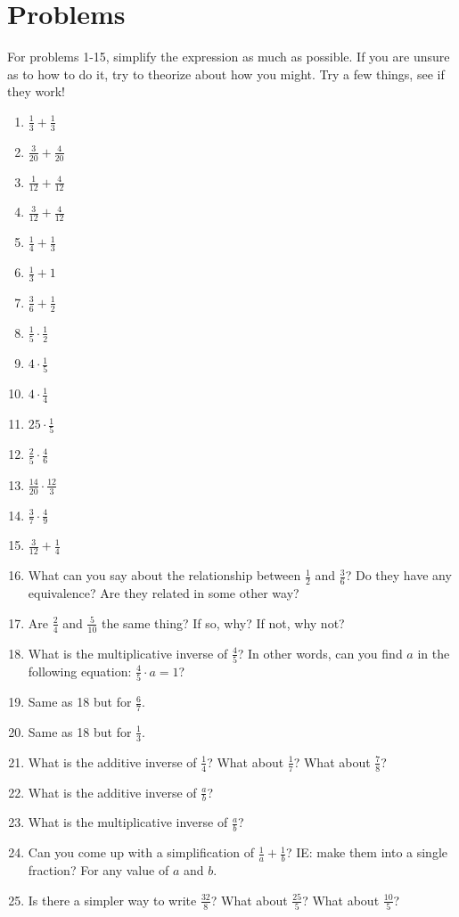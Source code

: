 \documentclass{article}
\begin{document}
\section*{Problems}
\begin{multicols*}{2}
    For problems 1-15, simplify the expression as much as possible. If you are unsure as to how to do it, try to theorize about how you might. Try a few things, see if they work!
    \begin{enumerate}
        \item $ \frac{1}{3} + \frac{1}{3}$
        \item $ \frac{3}{20} + \frac{4}{20} $
        \item $ \frac{1}{12} + \frac{4}{12} $
        \item $ \frac{3}{12} + \frac{4}{12} $
        \item $ \frac{1}{4} + \frac{1}{3} $
        \item $ \frac{1}{3} + 1 $
        \item $ \frac{3}{6} + \frac{1}{2} $
        \item $ \frac{1}{5} \cdot \frac{1}{2} $
        \item $ 4 \cdot \frac{1}{5} $
        \item $ 4 \cdot \frac{1}{4} $ 
        \item $ 25 \cdot \frac{1}{5} $
        \item $ \frac{2}{5} \cdot \frac{4}{6} $
        \item $ \frac{14}{20} \cdot \frac{12}{3} $
        \item $ \frac{3}{7} \cdot \frac{4}{9} $
        \item $ \frac{3}{12} + \frac{1}{4} $
        \item What can you say about the relationship between $\frac{1}{2}$ and $\frac{3}{6}$? Do they have any equivalence? Are they related in some other way?
        \item Are $\frac{2}{4}$ and $\frac{5}{10}$ the same thing? If so, why? If not, why not? 
        \item What is the multiplicative inverse of $\frac{4}{5}$? In other words, can you find $a$ in the following equation: $\frac{4}{5} \cdot a = 1$?
        \item Same as 18 but for $\frac{6}{7}$. 
        \item Same as 18 but for $\frac{1}{3}$. 
        \item What is the additive inverse of $\frac{1}{4}$? What about $\frac{1}{7}$? What about $\frac{7}{8}$? 
        \item What is the additive inverse of $\frac{a}{b}$? 
        \item What is the multiplicative inverse of $\frac{a}{b}$?
        \item Can you come up with a simplification of $\frac{1}{a} + \frac{1}{b}$? IE: make them into a single fraction? For any value of $a$ and $b$. 
        \item Is there a simpler way to write $\frac{32}{8}$? What about $\frac{25}{5}$? What about $\frac{10}{5}$? 
    \end{enumerate}
\end{multicols*}
\end{document}
